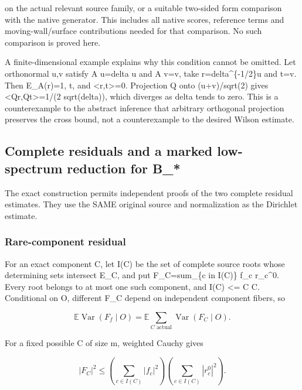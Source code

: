 \documentclass[
  11pt,
]{article}
\begin{document}
on the actual relevant source family, or a suitable two-sided form
comparison with the native generator. This includes all native scores,
reference terms and moving-wall/surface contributions needed for that
comparison. No such comparison is proved here.

A finite-dimensional example explains why this condition cannot be
omitted. Let orthonormal u,v satisfy A u=delta u and A v=v, take
r=delta\^{}\{-1/2\}u and t=v. Then E\_A(r)=1,
\textbar\textbar t\textbar{}, and \textless r,t\textgreater=0.
Projection Q onto (u+v)/sqrt(2) gives \textless Qr,Qt\textgreater=1/(2
sqrt(delta)), which diverges as delta tends to zero. This is a
counterexample to the abstract inference that arbitrary orthogonal
projection preserves the cross bound, not a counterexample to the
desired Wilson estimate.

\hypertarget{complete-residuals-and-a-marked-low-spectrum-reduction-for-b_}{%
\subsection{Complete residuals and a marked low-spectrum reduction for
B\_*}\label{complete-residuals-and-a-marked-low-spectrum-reduction-for-b_}}

The exact construction permits independent proofs of the two complete
residual estimates. They use the SAME original source and normalization
as the Dirichlet estimate.

\hypertarget{rare-component-residual}{%
\subsubsection{Rare-component residual}\label{rare-component-residual}}

For an exact component C, let I(C) be the set of complete source roots
whose determining sets intersect E\_C, and put F\_C=sum\_\{c in I(C)\}
f\_c r\_c\^{}0. Every root belongs to at most one such component, and
\textbar I(C)\textbar{} \textless= C \textbar C\textbar. Conditional on
O, different F\_C depend on independent component fibers, so

\[
 \mathbb E\operatorname{Var}(F_f\mid O)
 =\mathbb E\sum_{C\text{ actual}}
                   \operatorname{Var}(F_C\mid O).
 \tag{6.0a}
\]

For a fixed possible C of size m, weighted Cauchy gives

\[
 |F_C|^2\le
       \left(\sum_{c\in I(C)}|f_c|^2\right)
       \left(\sum_{c\in I(C)}|r_c^0|^2\right).
 \tag{6.0b}
\]
\end{document}
